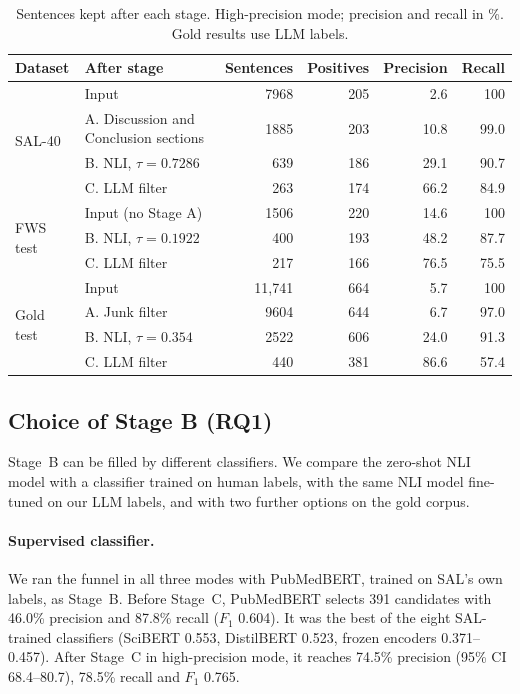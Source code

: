 \begin{table}[htbp]
\caption{Sentences kept after each stage. High-precision mode; precision and recall in \%. Gold results use LLM labels.\label{tab:stages}}
\small
\begin{tabularx}{\textwidth}{@{}l>{\raggedright\arraybackslash}Xrrrr@{}}
\toprule
\textbf{Dataset} & \textbf{After stage} & \textbf{Sentences} & \textbf{Positives} & \textbf{Precision} & \textbf{Recall}\\
\midrule
\multirow{4}{*}{SAL-40} & Input & 7968 & 205 & 2.6 & 100\\
 & A. Discussion and Conclusion sections & 1885 & 203 & 10.8 & 99.0\\
 & B. NLI, $\tau = 0.7286$ & 639 & 186 & 29.1 & 90.7\\
 & C. LLM filter & 263 & 174 & 66.2 & 84.9\\
\midrule
\multirow{3}{*}{FWS test} & Input (no Stage A) & 1506 & 220 & 14.6 & 100\\
 & B. NLI, $\tau = 0.1922$ & 400 & 193 & 48.2 & 87.7\\
 & C. LLM filter & 217 & 166 & 76.5 & 75.5\\
\midrule
\multirow{4}{*}{Gold test} & Input & 11,741 & 664 & 5.7 & 100\\
 & A. Junk filter & 9604 & 644 & 6.7 & 97.0\\
 & B. NLI, $\tau = 0.354$ & 2522 & 606 & 24.0 & 91.3\\
 & C. LLM filter & 440 & 381 & 86.6 & 57.4\\
\bottomrule
\end{tabularx}
\end{table}

\subsection{Choice of Stage B (RQ1)}
\label{sec:rq4}

Stage~B can be filled by different classifiers. We compare the zero-shot NLI model with a classifier trained on human labels, with the same NLI model fine-tuned on our LLM labels, and with two further options on the gold corpus.

\paragraph{Supervised classifier.} We ran the funnel in all three modes with PubMedBERT, trained on SAL's own labels, as Stage~B. Before Stage~C, PubMedBERT selects 391 candidates with 46.0\% precision and 87.8\% recall ($F_1$ 0.604). It was the best of the eight SAL-trained classifiers (SciBERT 0.553, DistilBERT 0.523, frozen encoders 0.371--0.457). After Stage~C in high-precision mode, it reaches 74.5\% precision (95\% CI 68.4--80.7), 78.5\% recall and $F_1$ 0.765.


